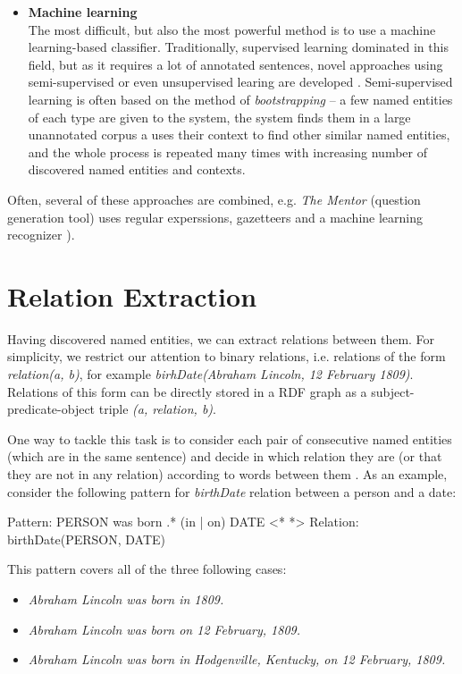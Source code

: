 \documentclass[a4paper, 12pt, twoside]{fithesis2}		%
\renewcommand{\_}{\leavevmode \kern0.07em\vbox{\hrule width0.4em}}
\newcommand{\squarebullet}{\textcolor{black}{\raisebox{0.15em}{\rule{4pt}{4pt}}}}
\newcommand{\emptysquarebullet}{\textcolor{black}{\raisebox{0.10em}{\tiny$\square$}}}
\newenvironment{myItemize}{
  \begin{itemize}[leftmargin=2em,rightmargin=1em,itemsep=\parskip ,parsep=0em,topsep=0em,partopsep=0em]
  \renewcommand{\labelitemi}{\squarebullet}
  \renewcommand{\labelitemii}{\textbullet}
}{
  \end{itemize}
}
\newcommand{\arrowlinesplit}{%
  \noindent\makebox[\linewidth]{\raisebox{0.15em}{\rule{0.478\textwidth}{0.5pt}}%
  ~$\downarrow$~%
  \noindent\raisebox{0.15em}{\rule{0.478\textwidth}{0.5pt}}}%
}
\begin{document}
\begin{myItemize}
\item \textbf{Machine learning}\\
  The most difficult, but also the most powerful method is to use a machine learning-based classifier.
  Traditionally, supervised learning dominated in this field,
  but as it requires a lot of annotated sentences,
  novel approaches using semi-supervised or even unsupervised learing are developed
  \cite{named-entity-recognition}.
  Semi-supervised learning is often based on the method of \emph{bootstrapping} -- a few named entities of each type are given to the system, the system finds them in a large unannotated corpus a uses their context to find other similar named entities, and the whole process is repeated many times with increasing number of discovered named entities and contexts.
\end{myItemize}
Often, several of these approaches are combined, e.g. \textit{The Mentor} (question generation tool) uses regular experssions, gazetteers and a machine learning recognizer \cite{mentor}).


\section{Relation Extraction}
\label{sec:relations-extraction}

Having discovered named entities, we can extract relations between them.
For simplicity, we restrict our attention to binary relations,
i.e. relations of the form \emph{relation(a, b)},
for example \emph{birhDate(Abraham Lincoln, 12 February 1809)}.
Relations of this form can be directly stored in a RDF graph as a subject-predicate-object triple
\emph{(a, relation, b)}.

One way to tackle this task is to consider each pair of consecutive named entities (which are in the same sentence) and decide in which relation they are (or that they are not in any relation) according to words between them \cite[][284]{nlp-python}.
As an example, consider the following pattern for \emph{birthDate} relation between a person and a date:
\begin{code}
Pattern: PERSON was born .* (in | on) DATE
<*\arrowlinesplit*>
Relation: birthDate(PERSON, DATE)
\end{code}
This pattern covers all of the three following cases:
\begin{myItemize}
  \item \emph{Abraham Lincoln was born in 1809.}
  \item \emph{Abraham Lincoln was born on 12 February, 1809.}
  \item \emph{Abraham Lincoln was born in Hodgenville, Kentucky, on 12 February, 1809.}
\end{myItemize}
\end{document}
